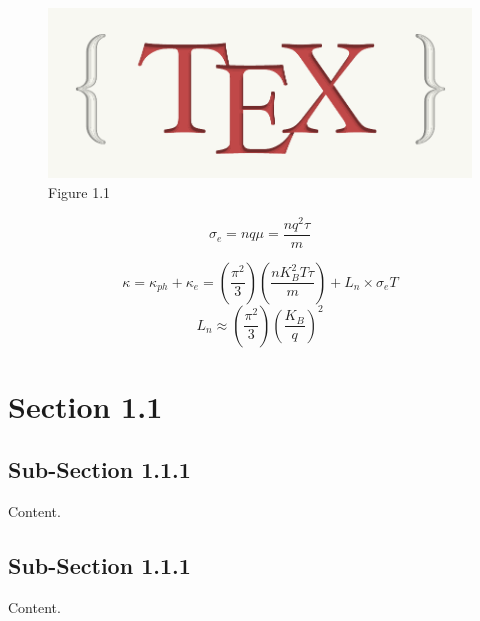 \justify
\skipspace
\begin{figure}[!ht]
    \centering
    \includegraphics[scale=0.25]{images/logo.png}
    \caption{Figure 1.1}
    \label{Fig: 1.1}
\end{figure}

\begin{center}
    \begin{equation}
        \sigma_e  = nq\mu = \frac{nq^2\tau}{m}
        \label{Eqn: 1.2}
    \end{equation}
\end{center}

\begin{center}
    \begin{equation}
        \kappa  = \kappa_{ph} + \kappa_e = (\frac{\pi^2}{3})(\frac{nK_B^2T\tau}{m}) + L_n\times \sigma_eT
        \label{Eqn: 1.3}
    \end{equation}
    \begin{equation}
        L_n \approx (\frac{\pi^2}{3})(\frac{K_B}{q})^2
        \label{Eqn: 1.4}
    \end{equation}
\end{center}

\section{Section 1.1}
\subsection{Sub-Section 1.1.1}
\justify
\skipspace Content.

\subsection{Sub-Section 1.1.1}
\justify
\skipspace Content.

\newpage



